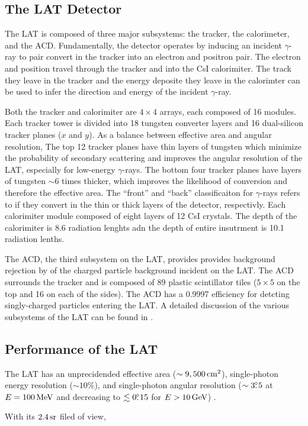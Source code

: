 \subsection{The \acs{LAT} Detector}

The \ac{LAT} is composed of three major subsystems: the tracker, the
calorimeter, and the \ac{ACD}. Fundamentally, the detector operates by
inducing an incident $\gamma$-ray to pair convert in the tracker into
an electron and positron pair. The electron and position travel through
the tracker and into the \ac{CsI} calorimiter.  The track they leave in
the tracker and the energy deposite they leave in the calorimter can be
used to infer the direction and energy of the incident $\gamma$-ray.

Both the tracker and calorimiter are $4\times4$ arrays, each composed of
16 modules.  Each tracker tower is divided into 18 tungsten converter
layers and 16 dual-silicon tracker planes ($x$ and $y$).  As a balance
between effective area and angular resolution, The top 12 tracker planes
have thin layers of tungsten which minimize the probability of secondary
scattering and improves the angular resolution of the \ac{LAT}, especially
for low-energy $\gamma$-rays. The bottom four tracker planes have layers
of tungsten $\sim6$ times thicker, which improves the likelihood of
conversion and therefore the effective area.  The ``front'' and ``back''
classificaiton for $\gamma$-rays refers to if they convert in the thin
or thick layers of the detector, respectivly.  Each calorimiter module
composed of eight layers of 12 \ac{CsI} crystals. The depth of the
calorimiter is 8.6 radiation lenghts adn the depth of entire insutrment
is 10.1 radiation lenths.

The \ac{ACD}, the third subsystem on the \ac{LAT}, provides provides
background rejection by of the charged particle background incident
on the \ac{LAT}.  The \ac{ACD} surrounds the tracker and is composed
of 89 plastic scintillator tiles ($5\times5$ on the top and 16
on each of the sides). The \ac{ACD} has a 0.9997 efficiency for
detcting singly-charged particles entering the \ac{LAT}.  A detailed
discussion of the various subsystems of the LAT can be found in
\citep{atwood_2009a_large-telescope}.

\subsection{Performance of the \acs{LAT}}

The \ac{LAT} 
has an unprecidended effective area ($\sim9,500\,\text{cm}^2$),
single-photon energy resolution ($\sim10\%$), and single-photon
angular resolution ($\sim3\mbox{$.\!\!^\circ$}5$ at $E=100\,\text{MeV}$
and decreasing to $\lesssim0\mbox{$.\!\!^\circ$}15$ for $E>10\,\text{GeV}$)
\citep{atwood_2009a_large-telescope}.

With its $2.4\,\text{sr}$ filed of view,

